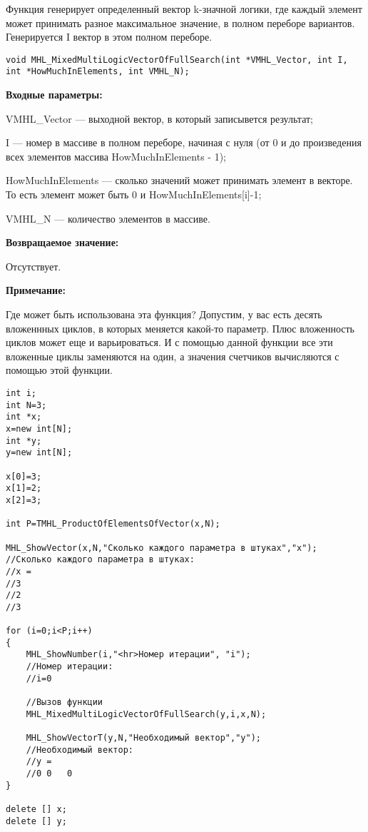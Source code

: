 \documentclass[a4paper,12pt]{article}
\begin{document}
Функция генерирует определенный вектор k-значной логики, где каждый элемент может принимать разное максимальное значение, в полном переборе вариантов. Генерируется I вектор в этом полном переборе.


\begin{lstlisting}[label=code_syntax_MHL_MixedMultiLogicVectorOfFullSearch,caption=Синтаксис]
void MHL_MixedMultiLogicVectorOfFullSearch(int *VMHL_Vector, int I, int *HowMuchInElements, int VMHL_N);
\end{lstlisting}

\textbf{Входные параметры:}

VMHL\_Vector --- выходной вектор, в который записывется результат;
 
I --- номер в массиве в полном переборе, начиная с нуля (от 0 и до произведения всех элементов массива HowMuchInElements - 1);
 
HowMuchInElements --- сколько значений может принимать элемент в векторе. То есть элемент может быть 0 и HowMuchInElements[i]-1;
 
VMHL\_N --- количество элементов в массиве.

\textbf{Возвращаемое значение:}
 
Отсутствует.

\textbf{Примечание:}
 
Где может быть использована эта функция? Допустим, у вас есть десять вложеннных циклов, в которых меняется какой-то параметр. Плюс вложенность циклов может еще и варьироваться. И с помощью данной функции все эти вложенные циклы заменяются на один, а значения счетчиков вычисляются с помощью этой функции.


\begin{lstlisting}[label=code_use_MHL_MixedMultiLogicVectorOfFullSearch,caption=Пример использования]
int i;
int N=3;
int *x;
x=new int[N];
int *y;
y=new int[N];

x[0]=3;
x[1]=2;
x[2]=3;

int P=TMHL_ProductOfElementsOfVector(x,N);

MHL_ShowVector(x,N,"Сколько каждого параметра в штуках","x");
//Сколько каждого параметра в штуках:
//x =
//3
//2
//3

for (i=0;i<P;i++)
{
    MHL_ShowNumber(i,"<hr>Номер итерации", "i");
    //Номер итерации:
    //i=0

    //Вызов функции
    MHL_MixedMultiLogicVectorOfFullSearch(y,i,x,N);

    MHL_ShowVectorT(y,N,"Необходимый вектор","y");
    //Необходимый вектор:
    //y =
    //0	0	0
}

delete [] x;
delete [] y;
\end{lstlisting}
\end{document}
